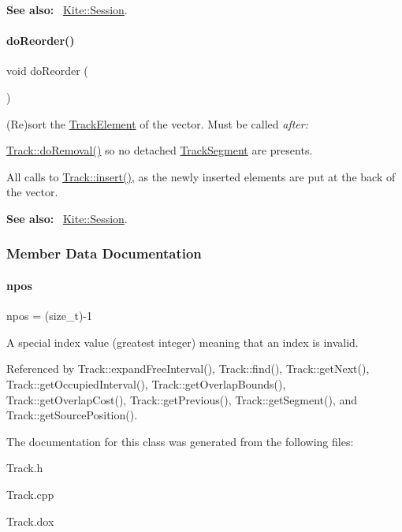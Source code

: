 {\bfseries See also\+:}~ \mbox{\hyperlink{classKite_1_1Session}{Kite\+::\+Session}}. \mbox{\label{classKite_1_1Track_aaccb9224f5b38ecd8506fd1eec9ef5ca}} 
\paragraph{\texorpdfstring{do\+Reorder()}{doReorder()}}
{\footnotesize\ttfamily void do\+Reorder (\begin{DoxyParamCaption}{ }\end{DoxyParamCaption})}

(Re)sort the \mbox{\hyperlink{classKite_1_1TrackElement}{Track\+Element}} of the vector. Must be called {\itshape after\+:} 
\begin{DoxyItemize}
\item \mbox{\hyperlink{classKite_1_1Track_abfffcd781865b94f62f27a1e7be99a38}{Track\+::do\+Removal()}} so no detached \mbox{\hyperlink{classKite_1_1TrackSegment}{Track\+Segment}} are presents.
\item All calls to \mbox{\hyperlink{classKite_1_1Track_aa392ba7cf1e3e485aac11cf326e31918}{Track\+::insert()}}, as the newly inserted elements are put at the back of the vector.
\end{DoxyItemize}

{\bfseries See also\+:}~ \mbox{\hyperlink{classKite_1_1Session}{Kite\+::\+Session}}. 

\subsubsection{Member Data Documentation}
\mbox{\label{classKite_1_1Track_ae0070ea45b2592ce3701ab9e486e58a0}} 
\paragraph{\texorpdfstring{npos}{npos}}
{\footnotesize\ttfamily npos = (size\+\_\+t)-\/1\hspace{0.3cm}{\ttfamily [static]}}

A special index value (greatest integer) meaning that an index is invalid. 

Referenced by Track\+::expand\+Free\+Interval(), Track\+::find(), Track\+::get\+Next(), Track\+::get\+Occupied\+Interval(), Track\+::get\+Overlap\+Bounds(), Track\+::get\+Overlap\+Cost(), Track\+::get\+Previous(), Track\+::get\+Segment(), and Track\+::get\+Source\+Position().



The documentation for this class was generated from the following files\+:\begin{DoxyCompactItemize}
\item 
Track.\+h\item 
Track.\+cpp\item 
Track.\+dox\end{DoxyCompactItemize}

